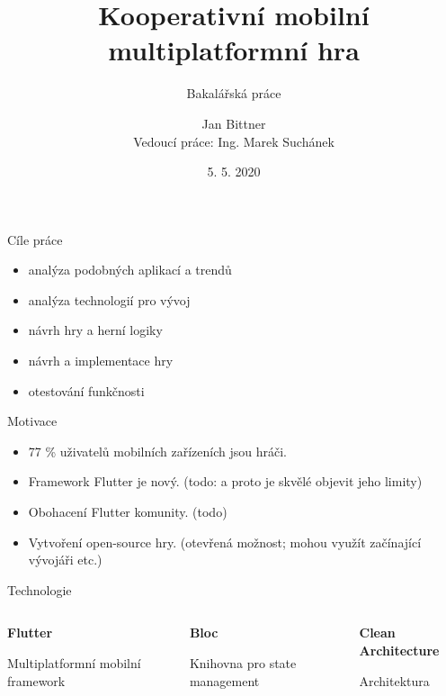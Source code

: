 \documentclass[czech,aspectratio=169]{beamer}
\title[Kooperativní mobilní multiplatformní hra]{Kooperativní mobilní multiplatformní hra}
\subtitle{Bakalářská práce}
\institute[FIT ČVUT v Praze]{Fakulta informačních technologií \\ České vysoké učení technické v Praze}
\author[J. Bittner]{Jan Bittner \\ Vedoucí práce: Ing. Marek Suchánek}
\date{5. 5. 2020}
\begin{document}
  \begin{frame}
    \titlepage 
  \end{frame}
  
  
  \begin{frame}{Cíle práce}
    \begin{itemize}
      \item analýza podobných aplikací a trendů
      \item analýza technologií pro vývoj
      \item návrh hry a herní logiky
      \item návrh a implementace hry
      \item otestování funkčnosti
    \end{itemize}
  \end{frame}

  \begin{frame}{Motivace}
    \begin{itemize}
      \item 77 \% uživatelů mobilních zařízeních jsou hráči.
      \item Framework Flutter je nový. (todo: a proto je skvělé objevit jeho limity)
      \item Obohacení Flutter komunity. (todo) 
      \item Vytvoření open-source hry. (otevřená možnost; mohou využít začínající vývojáři etc.)
    \end{itemize}
  \end{frame}

  \begin{frame}{Technologie}
    \begin{columns}
      \begin{column}{.33\textwidth}
        \begin{center}
          \textbf{Flutter}

          Multiplatformní mobilní framework
        \end{center}
      \end{column}
      \begin{column}{.33\textwidth}
        \begin{center}
          \textbf{Bloc}

          Knihovna pro state management
        \end{center}
      \end{column}
      \begin{column}{.33\textwidth}
        \begin{center}
          \textbf{Clean Architecture}

          Architektura
        \end{center}
      \end{column}
    \end{columns}
  \end{frame}
\end{document}
